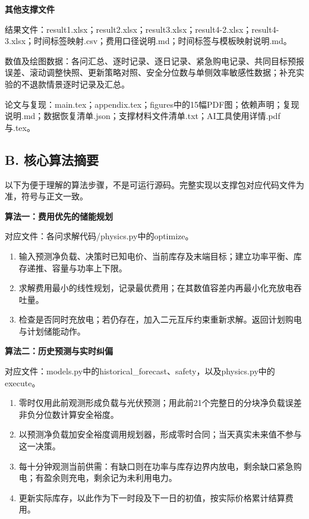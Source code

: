 \noindent\textbf{其他支撑文件}\par
结果文件：result1.xlsx；result2.xlsx；result3.xlsx；result4-2.xlsx；result4-3.xlsx；时间标签映射.csv；费用口径说明.md；时间标签与模板映射说明.md。\par
数值及绘图数据：各问汇总、逐时记录、逐日记录、紧急购电记录、共同目标预报误差、滚动调整快照、更新策略对照、安全分位数与单侧效率敏感性数据；补充实验的不退款情景逐时记录及汇总。\par
论文与复现：main.tex；appendix.tex；figures中的15幅PDF图；依赖声明；复现说明.md；数据恢复清单.json；支撑材料文件清单.txt；AI工具使用详情.pdf与.tex。\par

\subsection*{B. 核心算法摘要}
以下为便于理解的算法步骤，不是可运行源码。完整实现以支撑包对应代码文件为准，符号与正文一致。

\noindent\textbf{算法一：费用优先的储能规划}\par
对应文件：各问求解代码/physics.py中的optimize。
\begin{enumerate}
\item 输入预测净负载、决策时已知电价、当前库存及末端目标；建立功率平衡、库存递推、容量与功率上下限。
\item 求解费用最小的线性规划，记录最优费用；在其数值容差内再最小化充放电吞吐量。
\item 检查是否同时充放电；若仍存在，加入二元互斥约束重新求解。返回计划购电与计划储能动作。
\end{enumerate}

\noindent\textbf{算法二：历史预测与实时纠偏}\par
对应文件：models.py中的historical\_forecast、safety，以及physics.py中的execute。
\begin{enumerate}
\item 零时仅用此前观测形成负载与光伏预测；用此前21个完整日的分块净负载误差非负分位数计算安全裕度。
\item 以预测净负载加安全裕度调用规划器，形成零时合同；当天真实未来值不参与这一决策。
\item 每十分钟观测当前供需：有缺口则在功率与库存边界内放电，剩余缺口紧急购电；有盈余则充电，剩余记为未利用电力。
\item 更新实际库存，以此作为下一时段及下一日的初值，按实际价格累计结算费用。
\end{enumerate}

